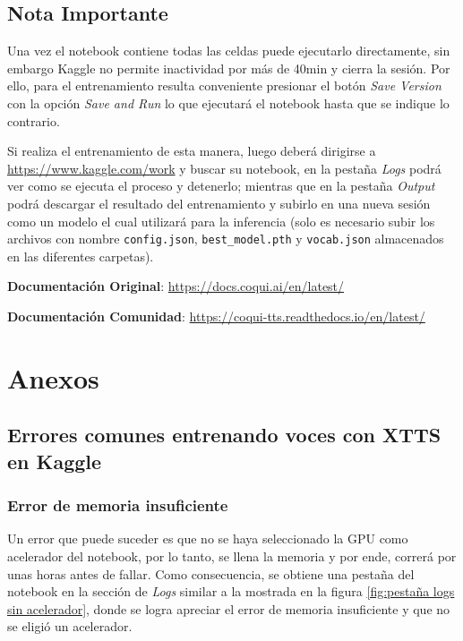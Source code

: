     \subsection{Nota Importante}
    Una vez el notebook contiene todas las celdas puede ejecutarlo directamente, sin embargo Kaggle no permite inactividad por más de 40min y cierra la sesión. Por ello, para el entrenamiento resulta conveniente presionar el botón \textit{Save Version} con la opción \textit{Save and Run} lo que ejecutará el notebook hasta que se indique lo contrario.

    Si realiza el entrenamiento de esta manera, luego deberá dirigirse a \url{https://www.kaggle.com/work} y buscar su notebook, en la pestaña \textit{Logs} podrá ver como se ejecuta el proceso y detenerlo; mientras que en la pestaña \textit{Output} podrá descargar el resultado del entrenamiento y subirlo en una nueva sesión como un modelo el cual utilizará para la inferencia (solo es necesario subir los archivos con nombre \texttt{config.json}, \texttt{best\_model.pth} y \texttt{vocab.json} almacenados en las diferentes carpetas).

    \textbf{Documentación Original}\cite{coqui-original}: \url{https://docs.coqui.ai/en/latest/}
    
    \textbf{Documentación Comunidad}\cite{coqui-community}: \url{https://coqui-tts.readthedocs.io/en/latest/}
    
    
    

    \newpage
    \section{Anexos}


    \subsection{Errores comunes entrenando voces con XTTS en Kaggle}
    
    \subsubsection{Error de memoria insuficiente}

    Un error que puede suceder es que no se haya seleccionado la GPU como acelerador del notebook, por lo tanto, se llena la memoria y por ende, correrá por unas horas antes de fallar. Como consecuencia, se obtiene una pestaña del notebook en la sección de \textit{Logs} similar a la mostrada en la figura \ref{fig:pestaña logs sin acelerador}, donde se logra apreciar el error de memoria insuficiente y que no se eligió un acelerador.

